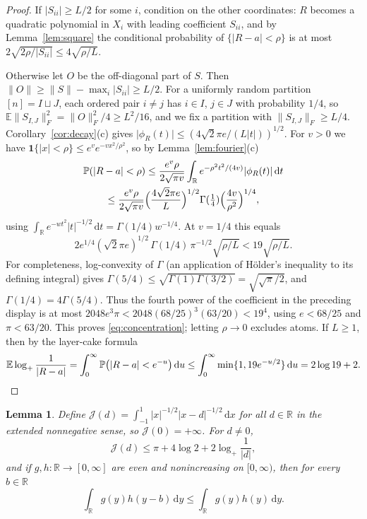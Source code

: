 \documentclass[11pt]{amsart}
\numberwithin{equation}{section}
\newtheorem{lemma}[theorem]{Lemma}
\theoremstyle{definition}
\theoremstyle{remark}
\newcommand{\R}{\mathbb R}
\newcommand{\E}{\mathbb E}
\newcommand{\PP}{\mathbb P}
\newcommand{\1}{\mathbf 1}
\newcommand{\dd}{\,\mathrm d}
\newcommand{\logp}{\log_+}
\newcommand{\norm}[1]{\lVert #1\rVert}
\newcommand{\abs}[1]{\lvert #1\rvert}
\begin{document}
\begin{proof}
If $\abs{S_{ii}}\ge L/2$ for some $i$, condition on the other coordinates: $R$ becomes a quadratic polynomial in $X_i$ with leading coefficient $S_{ii}$, and by Lemma~\ref{lem:square} the conditional probability of $\{\abs{R-a}<\rho\}$ is at most $2\sqrt{2\rho/\abs{S_{ii}}}\le4\sqrt{\rho/L}$.

Otherwise let $O$ be the off-diagonal part of $S$. Then $\norm O\ge\norm S-\max_i\abs{S_{ii}}\ge L/2$. For a uniformly random partition $[n]=I\sqcup J$, each ordered pair $i\ne j$ has $i\in I$, $j\in J$ with probability $1/4$, so $\E\norm{S_{I,J}}_F^2=\norm O_F^2/4\ge L^2/16$, and we fix a partition with $\norm{S_{I,J}}_F\ge L/4$. Corollary~\ref{cor:decay}(c) gives $\abs{\phi_R(t)}\le(4\sqrt2\pi e/(L\abs t))^{1/2}$. For $v>0$ we have $\1\{\abs x<\rho\}\le e^{v}e^{-vx^2/\rho^2}$, so by Lemma~\ref{lem:fourier}(c)
\begin{multline*}
\PP(\abs{R-a}<\rho)\le\frac{e^v\rho}{2\sqrt{\pi v}}\int_\R e^{-\rho^2t^2/(4v)}\abs{\phi_R(t)}\dd t\\
\le\frac{e^v\rho}{2\sqrt{\pi v}}\Bigl(\frac{4\sqrt2\pi e}{L}\Bigr)^{1/2}\Gamma(\tfrac14)\Bigl(\frac{4v}{\rho^2}\Bigr)^{1/4},
\end{multline*}
using $\int_\R e^{-wt^2}\abs t^{-1/2}\dd t=\Gamma(1/4)w^{-1/4}$. At $v=1/4$ this equals
\[
2e^{1/4}(\sqrt2\pi e)^{1/2}\,\Gamma(1/4)\,\pi^{-1/2}\sqrt{\rho/L}<19\sqrt{\rho/L}.
\]
For completeness, log-convexity of $\Gamma$ (an application of H\"older's inequality to its defining integral) gives $\Gamma(5/4)\le\sqrt{\Gamma(1)\Gamma(3/2)}=\sqrt{\sqrt\pi/2}$, and $\Gamma(1/4)=4\Gamma(5/4)$. Thus the fourth power of the coefficient in the preceding display is at most $2048e^3\pi<2048(68/25)^3(63/20)<19^4$, using $e<68/25$ and $\pi<63/20$. This proves \eqref{eq:concentration}; letting $\rho\to0$ excludes atoms. If $L\ge1$, then by the layer-cake formula
\[
\E\logp\frac1{\abs{R-a}}=\int_0^\infty\PP\bigl(\abs{R-a}<e^{-u}\bigr)\dd u\le\int_0^\infty\min\{1,19e^{-u/2}\}\dd u=2\log19+2 .\qedhere
\]
\end{proof}

\begin{lemma}\label{lem:kernels}
Define $\mathcal J(d)=\int_{-1}^1\abs x^{-1/2}\abs{x-d}^{-1/2}\dd x$ for all $d\in\R$ in the extended nonnegative sense, so $\mathcal J(0)=+\infty$. For $d\ne0$,
\begin{equation}\label{eq:J}
\mathcal J(d)\le\pi+4\log2+2\logp\frac1{\abs d},
\end{equation}
and if $g,h:\R\to[0,\infty]$ are even and nonincreasing on $[0,\infty)$, then for every $b\in\R$
\begin{equation}\label{eq:rearrange}
\int_\R g(y)h(y-b)\dd y\le\int_\R g(y)h(y)\dd y .
\end{equation}
\end{lemma}
\end{document}

